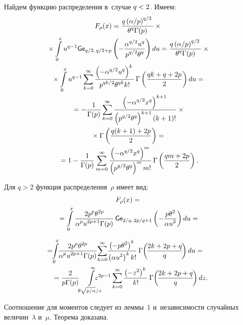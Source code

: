 \begin{multicols}{2}
Найдем функцию распределения в~случае $q\hm<2$. Имеем:
\begin{multline*}
F_\rho(x) =\displaystyle\frac{\displaystyle q \left(\alpha/p\right)^{q/2}\mathstrut}{\displaystyle {\theta^q  \Gamma(p)}\mathstrut} \times{}\\
{}\times\int\limits_{0}^{x} 
u^{q-1} {\sf Ge}_{q/2,\,q/2+p}\left(-\displaystyle\frac{\displaystyle  \alpha^{q/2} u^q\mathstrut}{\displaystyle p^{q/2}\theta^q\mathstrut}\right) 
 du =\displaystyle\frac{\displaystyle q \left(\alpha/p\right)^{q/2}\mathstrut}{\displaystyle {\theta^q  \Gamma(p)}\mathstrut}\times{}\\
 {}\times \int\limits_{0}^{x} u^{q-1} 
\sum\limits_{k=0}^\infty \displaystyle\frac{\displaystyle \left(-\alpha^{q/2} u^q\right)^k \mathstrut}{\displaystyle {p^{qk/2}\theta^{qk}k!}\mathstrut} \,
\Gamma\left(\displaystyle\frac{\displaystyle qk + q + 2p\mathstrut}{\displaystyle 2\mathstrut}\right)  du ={}\\
{}=-\displaystyle\frac{\displaystyle 1\mathstrut}{\displaystyle {\Gamma(p)}\mathstrut}\sum\limits_{k=0}^\infty \displaystyle\frac{\displaystyle \left(-\alpha^{q/2} x^q\right)^{k+1} 
\mathstrut}{\displaystyle {\left(p^{q/2}\theta^q\right)^{k+1}(k+1)!}\mathstrut} \times{}\\
{}\times\Gamma\left(\displaystyle\frac{\displaystyle q(k+1)+2p\mathstrut}{\displaystyle 2\mathstrut}\right)={}\\
{}=1-\displaystyle\frac{\displaystyle 1\mathstrut}{\displaystyle {\Gamma(p)}\mathstrut}\sum\limits_{m=0}^\infty \displaystyle\frac{\displaystyle \left(-\alpha^{q/2} x^q\right)^m 
\mathstrut}{\displaystyle {\left(p^{q/2}\theta^q\right)^mm!}\mathstrut}\,\Gamma\left(\frac{qm+2p}{2}\right).
\end{multline*}

Для $q>2$ функция распределения~$\rho$ имеет вид:
\begin{multline*}
F_\rho(x) = {}\\
{}=\int\limits_{0}^{x} \displaystyle\frac{\displaystyle 2p^p \theta^{2p}\mathstrut}{\displaystyle {\alpha^p 
u^{2p+1}\Gamma(p)}\mathstrut}\,{\sf Ge}_{2/q,\, 2p/q+1} \left(-\displaystyle\frac{\displaystyle p\theta^2\mathstrut}{\displaystyle \alpha u^2\mathstrut}\right) 
du ={}
\end{multline*}

\noindent
\begin{multline*}
\hspace*{-10pt}{}=\!\!\int\limits_{0}^{x}\!\!\fr{2p^p \theta^{2p}}{{\alpha^p 
u^{2p+1}\Gamma(p)}}\!\sum\limits_{k=0}^\infty \!\fr{\left(-p\theta^2\right)^k }
{{\left(\alpha 
u^2\right)^kk!}}\,\Gamma\!\left(\!\fr{2k+ 2p +q}{q}\!\right) du ={}\\
{} = \fr{2}{{ p\Gamma(p)}} \!\int\limits_{\theta\sqrt{p/\alpha}/x}^{\infty} 
\hspace*{-5mm}z^{2p-1}\sum\limits_{k=0}^\infty \fr{\left(-z^2\right)^k }{k!}\, 
\Gamma\!\left(\!\fr{2k+ 
2p+q}{q}\!\right) dz.\hspace*{-4.07877pt}
\end{multline*}

Соотношение для моментов следует из леммы~1 и~независимости случайных величин~$\lambda$ 
и~$\mu$. Теорема доказана.

\smallskip


\end{multicols}
